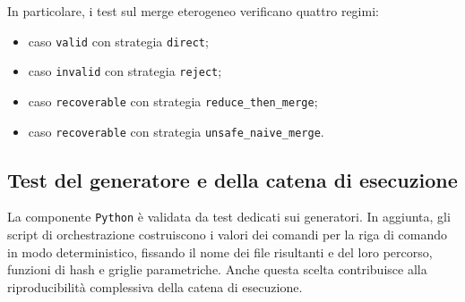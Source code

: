 In particolare, i test sul merge eterogeneo verificano quattro regimi:
\begin{itemize}
    \item caso \texttt{valid} con strategia \texttt{direct};
    \item caso \texttt{invalid} con strategia \texttt{reject};
    \item caso \texttt{recoverable} con strategia \texttt{reduce\_then\_merge};
    \item caso \texttt{recoverable} con strategia
    \texttt{unsafe\_naive\_merge}.
\end{itemize}

\subsection{Test del generatore e della catena di esecuzione}

La componente \texttt{Python} è validata da test dedicati sui generatori. In
aggiunta, gli script di orchestrazione costruiscono i valori dei comandi per la
riga di comando in modo deterministico, fissando il nome dei file risultanti e del loro percorso,
funzioni di hash e griglie parametriche. Anche questa scelta contribuisce alla
riproducibilità complessiva della catena di esecuzione.
